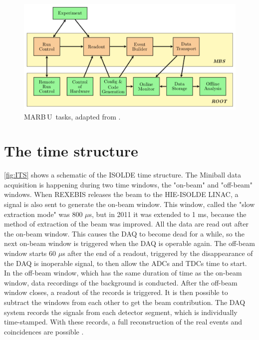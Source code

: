 \documentclass[twoside,english]{uiofysmaster/uiofysmaster}
\newcommand{\MBOU}{MAR\belowbaseline[-2pt]{a}B\stackinset{l}{3pt}{b}{-3pt}{O}{O}\,U}
\let\orgautoref\autoref
\renewcommand{\autoref}
        {%
		 \def\subsectionautorefname{Section}%
		 \def\subsubsectionautorefname{Section}%
          \orgautoref}
\begin{document}
\begin{figure}[ht]
	\centering
	\includegraphics[width=\linewidth]{Images/MARaBOOU.png}
	\caption{\protect\MBOU\ tasks, adapted from \cite{Maraboou}.}
	\label{fig:MARaBOOU}
\end{figure}


\section{The time structure}
\autoref{fig:ITS} shows a schematic of the ISOLDE time structure. 
The Miniball data acquisition is happening during two time windows, the "on-beam" and "off-beam" windows. 
When REXEBIS releases the beam to the HIE-ISOLDE LINAC, a signal is also sent to generate the on-beam window. 
This window, called the "slow extraction mode" was 800 $\mu$s, but in 2011 it was extended to 1 ms, because the method of extraction of the beam was improved. 
All the data are read out after the on-beam window. 
This causes the DAQ to become dead for a while, so the next on-beam window is triggered when the DAQ is operable again.
The off-beam window starts 60 $\mu$s after the end of a readout, triggered by the disappearance of the DAQ is inoperable signal, to then allow the ADCs and TDCs time to start. 
In the off-beam window, which has the same duration of time as the on-beam window, data recordings of the background is conducted.
After the off-beam window closes, a readout of the records is triggered.
It is then possible to subtract the windows from each other to get the beam contribution. 
The DAQ system records the signals from each detector segment, which is individually time-stamped. 
With these records, a full reconstruction of the real events and coincidences are possible \cite{NWarr-el}. 
\end{document}

